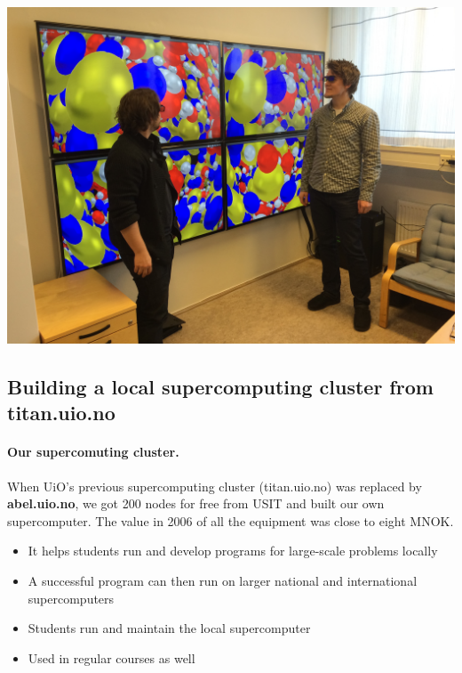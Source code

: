 \documentclass[%
twoside,                 %
final,                   %
10pt]{article}
\begin{document}
\noindent





\centerline{\includegraphics[width=1.0\linewidth]{fig-future/visualize.jpg}}






\subsection*{Building a local supercomputing cluster from titan.uio.no}

\paragraph{Our supercomuting cluster.}
When UiO's previous supercomputing cluster (titan.uio.no) was replaced by \textbf{abel.uio.no}, we got 200 nodes for free from USIT and built our own supercomputer. The value in 2006 of all the equipment was close to eight MNOK.
\begin{itemize}
\item It helps students run and develop programs for large-scale problems locally

\item A successful program can then run on larger national and international supercomputers

\item Students run and maintain the local supercomputer

\item Used in regular courses as well
\end{itemize}
\end{document}
